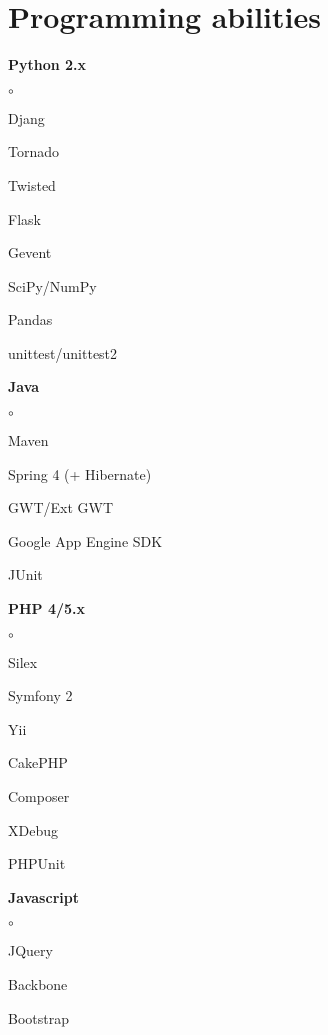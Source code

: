 \documentclass[9pt, a4paper, english]{extarticle}
\begin{document}
\section* {Programming abilities}
  \begin{multicols}{3}
    \begin {list}{\textbullet}{\itemsep=0mm}
      \item \textbf{Python 2.x}
        \begin {list}{$\circ$}{}
          \item Djang
          \item Tornado
          \item Twisted
          \item Flask
          \item Gevent
          \item SciPy/NumPy
          \item Pandas
          \item unittest/unittest2
        \end{list}
      \item \textbf{Java}
        \begin {list}{$\circ$}{}
          \item Maven
          \item Spring 4 (+ Hibernate)
          \item GWT/Ext GWT
          \item Google App Engine SDK
          \item JUnit
        \end{list}
      \columnbreak
      \item \textbf{PHP 4/5.x}
        \begin {list}{$\circ$}{}
          \item Silex
          \item Symfony 2
          \item Yii
          \item CakePHP
          \item Composer
          \item XDebug
          \item PHPUnit
        \end{list}
      \item \textbf{Javascript}
        \begin {list}{$\circ$}{}
          \item JQuery
          \item Backbone
          \item Bootstrap

\end{list}
\end{list}
\end{multicols}
\end{document}
